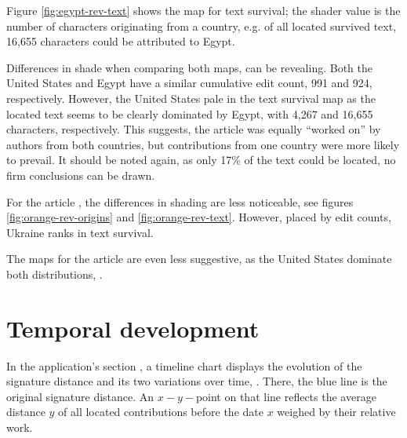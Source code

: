 Figure \ref{fig:egypt-rev-text} shows the map for text survival; the shader value is the number of characters originating from a country, e.g. of all located survived text, 16,655 characters could be attributed to Egypt.

Differences in shade when comparing both maps, can be revealing.
Both the United States and Egypt have a similar cumulative edit count, 991 and 924, respectively.
However, the United States pale in the text survival map as the located text seems to be clearly dominated by Egypt, with 4,267 and 16,655 characters, respectively.
This suggests, the article was equally ``worked on'' by authors from both countries, but contributions from one country were more likely to prevail.
It should be noted again, as only 17\% of the text could be located, no firm conclusions can be drawn.


For the article , the differences in shading are less noticeable, see figures \ref{fig:orange-rev-origins} and \ref{fig:orange-rev-text}.
However, placed  by edit counts, Ukraine ranks  in text survival.

The maps for the article  are even less suggestive, as the United States dominate both distributions, .



\section{Temporal development}

In the application's section , a timeline chart displays the evolution of the signature distance and its two variations over time, .
There, the blue line is the original signature distance.
An $x-y-$point on that line reflects the average distance $y$ of all located contributions before the date $x$ weighed by their relative work.

